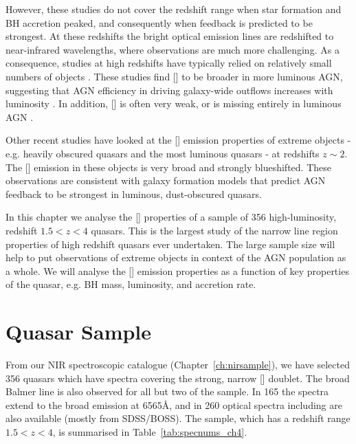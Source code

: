 However, these studies do not cover the redshift range when star formation and \ac{BH} accretion peaked, and consequently when feedback is predicted to be strongest. 
At these redshifts the bright optical emission lines are redshifted to near-infrared wavelengths, where observations are much more challenging. 
As a consequence, studies at high redshifts have typically relied on relatively small numbers of objects \citep[e.g.][]{netzer04,sulentic04,shen16a}.
These studies find [] to be broader in more luminous \ac{AGN}, suggesting that \ac{AGN} efficiency in driving galaxy-wide outflows increases with luminosity \citep[e.g.][]{netzer04,nesvadba08,kim13,brusa15,carniani15,perna15,bischetti16}. 
In addition, [] is often very weak, or is missing entirely in luminous \ac{AGN} \citep[e.g.][]{netzer04}. 

Other recent studies have looked at the [] emission properties of extreme objects - e.g. heavily obscured quasars \citep{zakamska16} and the most luminous quasars \citep{bischetti16} - at redshifts $z\sim2$. 
The [] emission in these objects is very broad and strongly blueshifted. 
These observations are consistent with galaxy formation models that predict \ac{AGN} feedback to be strongest in luminous, dust-obscured quasars.

In this chapter we analyse the [] properties of a sample of 356 high-luminosity, redshift $1.5 < z < 4$ quasars.
This is the largest study of the narrow line region properties of high redshift quasars ever undertaken. 
The large sample size will help to put observations of extreme objects in context of the \ac{AGN} population as a whole.
We will analyse the [] emission properties as a function of key properties of the quasar, e.g. \ac{BH} mass, luminosity, and accretion rate. 

\section{Quasar Sample}

From our \ac{NIR} spectroscopic catalogue (Chapter~\ref{ch:nirsample}), we have selected 356 quasars which have spectra covering the strong, narrow [] doublet. 
The broad Balmer \hb line is also observed for all but two of the sample. 
In 165 the spectra extend to the broad \ha emission at 6565\AA, and in 260 optical spectra including  are also available (mostly from \ac{SDSS}/\ac{BOSS}). 
The sample, which has a redshift range $1.5 < z < 4$, is summarised in Table~\ref{tab:specnums_ch4}.


